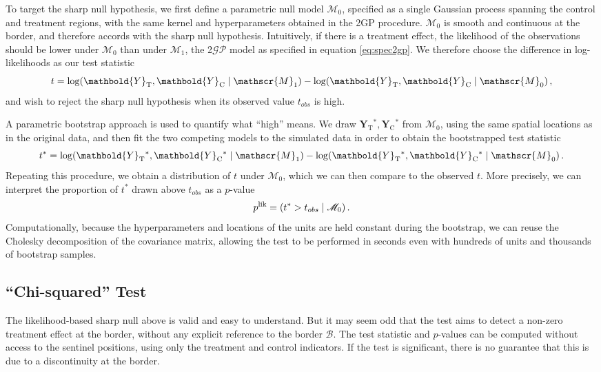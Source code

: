 \documentclass[letter]{article}
\DeclarePairedDelimiter{\parenthesis}{\lparen}{\rparen}
\newcommand{\del}[1]{\parenthesis*{#1}}
\let\Pr\relax
\DeclareMathOperator{\Pr}{\mathbb{P}}
\newcommand{\gp}{\mathcal{GP}}
\newcommand{\treat}{\mathrm{T}}
\newcommand{\ctrol}{\mathrm{C}}
\newcommand{\Yvec}{\mathbold{Y}}
\newcommand{\yt}{\Yvec_{\treat}}
\newcommand{\yc}{\Yvec_{\ctrol}}
\newcommand{\border}{\mathcal{B}}
\newcommand{\modnull}{\mathscr{M}_0}
\newcommand{\modalt}{\mathscr{M}_1}
\begin{document}
To target the sharp null hypothesis, we first define a parametric null model \(\modnull\),
specified as a single Gaussian process spanning the control and treatment regions,
with the same kernel and hyperparameters obtained in the 2GP procedure.
\(\modnull\) is smooth and continuous at the border,
and therefore accords with the sharp null hypothesis.
Intuitively, if there is a treatment effect,
the likelihood of the observations should be lower under \(\modnull\) than under \(\modalt\),
the 2\(\gp\) model as specified in equation \eqref{eq:spec2gp}.
We therefore choose the difference in log-likelihoods as our test statistic
\begin{equation}
    t = \log \Pr\del{\yt{}, \yc{} \mid \modalt} - \log \Pr\del{\yt{}, \yc{} \mid \modnull} \,,
\end{equation}
and wish to reject the sharp null hypothesis when its observed value \(t_{obs}\) is high.

A parametric bootstrap approach is used to quantify what ``high'' means. We draw \(\yt{}^*,\yc{}^*\) from \(\modnull\),
using the same spatial locations as in the original data,
and then fit the two competing models to the simulated data in order to obtain the bootstrapped test statistic
\begin{equation}
    t^* = \log \Pr\del{\yt{}^*, \yc{}^* \mid \modalt} - \log \Pr\del{\yt{}^*, \yc{}^* \mid \modnull}\,.
\end{equation}
Repeating this procedure, we obtain a distribution of \(t\) under \(\modnull\),
which we can then compare to the observed \(t\).
More precisely, we can interpret the proportion of \(t^*\) drawn above \(t_{obs}\) as a \(p\)-value
\begin{equation}
    p^{\mathrm{lik}} = \Pr\del{t^* > t_{obs} \mid \modnull}\,.
\end{equation}
Computationally, because the hyperparameters and locations of the units are held constant during the bootstrap, we can reuse the Cholesky decomposition of the covariance matrix, allowing the test to be performed in seconds even with hundreds of units and thousands of bootstrap samples.
    


    	\hypertarget{chi-squared-test}{%
\subsection{``Chi-squared'' Test}\label{chi-squared-test}}

The likelihood-based sharp null above is valid and easy to understand.
But it may seem odd that the test aims to detect a non-zero treatment effect at the border, without any explicit reference to the border \(\border\).
The test statistic and \(p\)-values can be computed without access to the sentinel positions, using only the treatment and control indicators.
If the test is significant, there is no guarantee that this is due to a discontinuity at the border.
\end{document}
